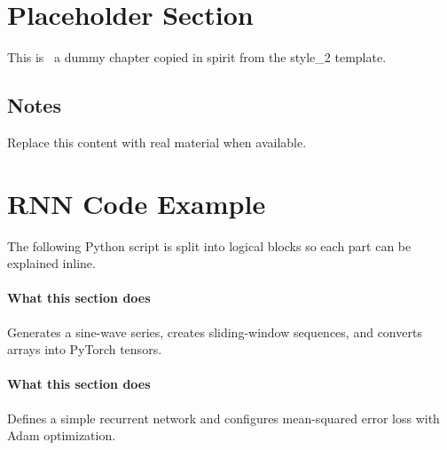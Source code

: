 
\section{Placeholder Section}
This is~\cite{adamsLaserPrintingSilver2024} a dummy chapter copied in spirit from the style\_2 template.

\subsection{Notes}
Replace this content with real material when available.

\section{RNN Code Example}
The following Python script is split into logical blocks so each part can be explained inline.


\paragraph{What this section does}
Generates a sine-wave series, creates sliding-window sequences, and converts arrays into PyTorch tensors.


\paragraph{What this section does}
Defines a simple recurrent network and configures mean-squared error loss with Adam optimization.

